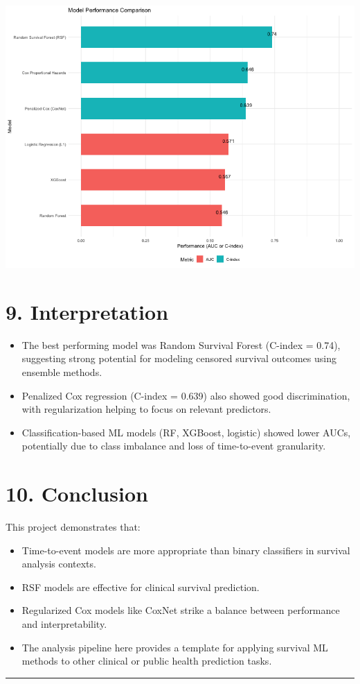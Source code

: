 \documentclass[
  11pt,
]{article}
\providecommand{\tightlist}{%
  \setlength{\itemsep}{0pt}\setlength{\parskip}{0pt}}
\begin{document}
\includegraphics[width=0.8\linewidth]{../outputs/plots/final_model_comparison_plot}

\section{9. Interpretation}\label{interpretation}

\begin{itemize}
\tightlist
\item
  The best performing model was Random Survival Forest (C-index = 0.74),
  suggesting strong potential for modeling censored survival outcomes
  using ensemble methods.
\item
  Penalized Cox regression (C-index = 0.639) also showed good
  discrimination, with regularization helping to focus on relevant
  predictors.
\item
  Classification-based ML models (RF, XGBoost, logistic) showed lower
  AUCs, potentially due to class imbalance and loss of time-to-event
  granularity.
\end{itemize}

\section{10. Conclusion}\label{conclusion}

This project demonstrates that:

\begin{itemize}
\tightlist
\item
  Time-to-event models are more appropriate than binary classifiers in
  survival analysis contexts.
\item
  RSF models are effective for clinical survival prediction.
\item
  Regularized Cox models like CoxNet strike a balance between
  performance and interpretability.
\item
  The analysis pipeline here provides a template for applying survival
  ML methods to other clinical or public health prediction tasks.
\end{itemize}

\begin{center}\rule{0.5\linewidth}{0.5pt}\end{center}
\end{document}
